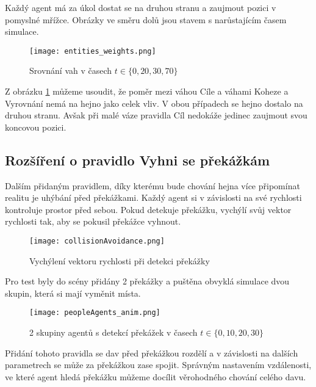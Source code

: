 Každý agent má za úkol dostat se na druhou stranu a zaujmout pozici v pomyslné mřížce. Obrázky ve směru dolů jsou stavem s narůstajícím časem simulace. 
\begin{figure}[H]
	\texttt{[image: entities\_weights.png]}
	\centering
	\caption{Srovnání vah v časech $t\in\{ 0,20,30,70\} $}
	\label{fig:srovnaniVahy}
\end{figure}
Z obrázku \ref{fig:srovnaniVahy} můžeme usoudit, že poměr mezi váhou Cíle a váhami Koheze a Vyrovnání nemá na hejno jako celek vliv. V obou případech se hejno dostalo na druhou stranu. Avšak při malé váze pravidla Cíl nedokáže jedinec zaujmout svou koncovou pozici.  

\subsection{Rozšíření o pravidlo Vyhni se překážkám}
Dalším přidaným pravidlem, díky kterému bude chování hejna více připomínat realitu je uhýbání před překážkami. Každý agent si v závislosti na své rychlosti kontroluje prostor před sebou. Pokud detekuje překážku, vychýlí svůj vektor rychlosti tak, aby se pokusil překážce vyhnout. 
\begin{figure}[H]
	\texttt{[image: collisionAvoidance.png]}
	\centering
	\caption{Vychýlení vektoru rychlosti při detekci překážky \cite{ReynoldsBoidNoBump} }
\end{figure}
Pro test byly do scény přidány 2 překážky a puštěna obvyklá simulace dvou skupin, která si mají vyměnit místa.  
\begin{figure}[H]
	\texttt{[image: peopleAgents\_anim.png]}
	\centering
	\caption{2 skupiny agentů s detekcí překážek v časech $t\in\{ 0,10,20,30\} $}
	\label{fig:agents_anim}
\end{figure}
Přidání tohoto pravidla se dav před překážkou rozdělí a v závislosti na dalších parametrech se může za překážkou zase spojit. Správným nastavením vzdálenosti, ve které agent hledá překážku můžeme docílit věrohodného chování celého davu. 
